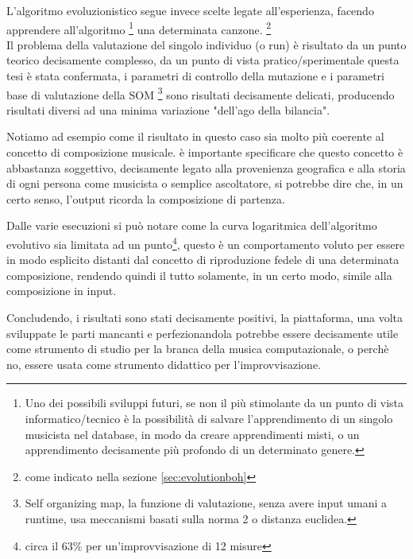 L'algoritmo evoluzionistico segue invece scelte legate all'esperienza,
facendo apprendere all'algoritmo
\footnote{Uno dei possibili sviluppi futuri, se non il più stimolante da un
punto di vista informatico/tecnico è la possibilità di salvare l'apprendimento
di un singolo musicista nel database, in modo da creare apprendimenti misti,
o un apprendimento decisamente più profondo di un determinato genere.}
una determinata canzone. \footnote{come indicato nella sezione \ref{sec:evolutionboh}}
\\
Il problema della valutazione del singolo individuo (o run) è risultato da un
punto teorico decisamente complesso, da un punto di vista pratico/sperimentale
questa tesi è stata confermata, i parametri di controllo della mutazione e
i parametri base di valutazione della SOM
\footnote{Self organizing map, la funzione di valutazione,
senza avere input umani a runtime, usa meccanismi basati sulla norma 2
o distanza euclidea.}
sono risultati decisamente delicati, producendo risultati diversi ad una minima
variazione "dell'ago della bilancia".


Notiamo ad esempio come il risultato in questo caso sia molto più coerente al
concetto di composizione musicale.
è importante specificare che questo concetto è abbastanza soggettivo,
decisamente legato alla provenienza geografica e alla storia di ogni persona
come musicista o semplice ascoltatore, si potrebbe dire che, in un certo senso,
l'output ricorda la composizione di partenza.

Dalle varie esecuzioni si può notare come la curva logaritmica dell'algoritmo
evolutivo sia limitata ad un punto\footnote{circa il 63\% per un'improvvisazione
di 12 misure}, questo è un comportamento voluto
per essere in modo esplicito distanti dal concetto di riproduzione fedele di una
determinata composizione, rendendo quindi il tutto solamente, in un certo modo,
simile alla composizione in input.

Concludendo, i risultati sono stati decisamente positivi, la piattaforma, una volta
sviluppate le parti mancanti e perfezionandola potrebbe essere decisamente utile
come strumento di studio per la branca della musica computazionale, o perchè no,
essere usata come strumento didattico per l'improvvisazione.
